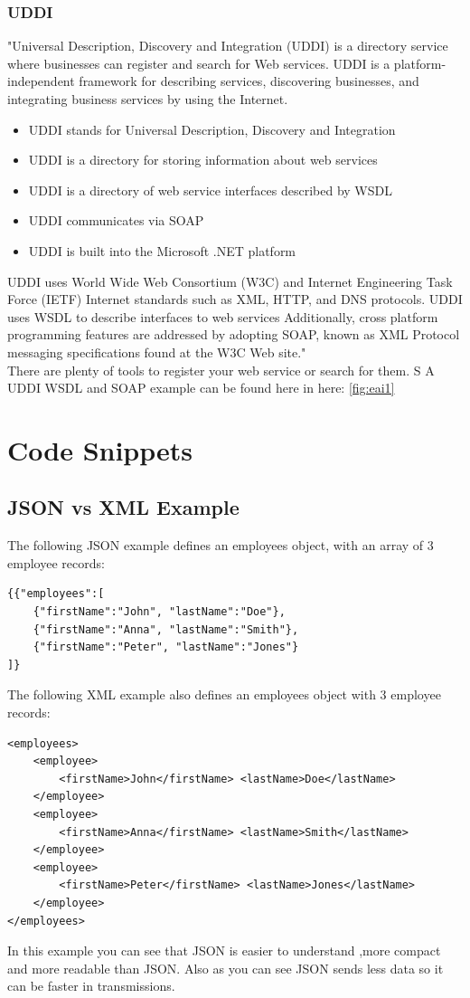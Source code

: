 \documentclass[12pt]{article}
\begin{document}
\subsubsection{UDDI}
"Universal Description, Discovery and Integration (UDDI) is a directory service where businesses can register and search for Web services.
UDDI is a platform-independent framework for describing services, discovering businesses, and integrating business services by using the Internet.\\
\begin{itemize}
\item UDDI stands for Universal Description, Discovery and Integration
\item UDDI is a directory for storing information about web services
\item UDDI is a directory of web service interfaces described by WSDL
\item UDDI communicates via SOAP
\item UDDI is built into the Microsoft .NET platform
\end{itemize}
UDDI uses World Wide Web Consortium (W3C) and Internet Engineering Task Force (IETF) Internet standards such as XML, HTTP, and DNS protocols.
UDDI uses WSDL to describe interfaces to web services Additionally, cross platform programming features are addressed by adopting SOAP, known as XML Protocol messaging specifications found at the W3C Web site."\cite{uddi}\\
There are plenty of tools to register your web service or search for them. S
A UDDI WSDL and SOAP example can be found here in here: \ref{fig:eai1}
\section{Code Snippets}
\subsection{JSON vs XML Example}
\label{sec:json}
The following JSON example defines an employees object, with an array of 3 employee records:
\begin{lstlisting}
{{"employees":[
    {"firstName":"John", "lastName":"Doe"}, 
    {"firstName":"Anna", "lastName":"Smith"},
    {"firstName":"Peter", "lastName":"Jones"}
]}
\end{lstlisting}
The following XML example also defines an employees object with 3 employee records:
\begin{lstlisting}
<employees>
    <employee>
        <firstName>John</firstName> <lastName>Doe</lastName>
    </employee>
    <employee>
        <firstName>Anna</firstName> <lastName>Smith</lastName>
    </employee>
    <employee>
        <firstName>Peter</firstName> <lastName>Jones</lastName>
    </employee>
</employees>
\end{lstlisting}
In this example you can see that JSON is easier to understand ,more compact and more readable than JSON.
Also as you can see JSON sends less data so it can be faster in transmissions.\cite{jsonxml}
\end{document}
